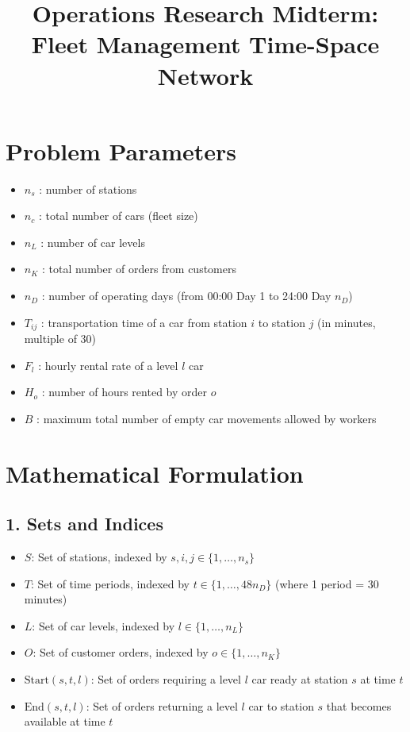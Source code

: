 \documentclass{article}
\title{Operations Research Midterm: Fleet Management Time-Space Network}
\author{}
\date{}
\begin{document}
\maketitle

\section*{Problem Parameters}
\begin{itemize}
    \item $n_s$ : number of stations
    \item $n_c$ : total number of cars (fleet size)
    \item $n_L$ : number of car levels
    \item $n_K$ : total number of orders from customers
    \item $n_D$ : number of operating days (from 00:00 Day 1 to 24:00 Day $n_D$)
    \item $T_{ij}$ : transportation time of a car from station $i$ to station $j$ (in minutes, multiple of 30)
    \item $F_l$ : hourly rental rate of a level $l$ car
    \item $H_o$ : number of hours rented by order $o$
    \item $B$ : maximum total number of empty car movements allowed by workers
\end{itemize}

\section*{Mathematical Formulation}

\subsection*{1. Sets and Indices}
\begin{itemize}
    \item $S$: Set of stations, indexed by $s, i, j \in \{1, \dots, n_s\}$
    \item $T$: Set of time periods, indexed by $t \in \{1, \dots, 48n_D\}$ (where 1 period = 30 minutes)
    \item $L$: Set of car levels, indexed by $l \in \{1, \dots, n_L\}$
    \item $O$: Set of customer orders, indexed by $o \in \{1, \dots, n_K\}$
    \item $\text{Start}(s, t, l)$: Set of orders requiring a level $l$ car ready at station $s$ at time $t$
    \item $\text{End}(s, t, l)$: Set of orders returning a level $l$ car to station $s$ that becomes available at time $t$
\end{itemize}
\end{document}
